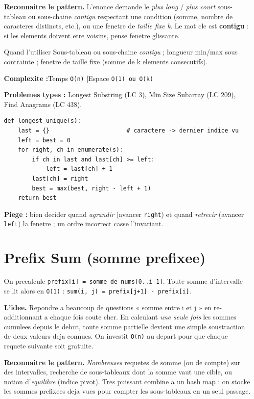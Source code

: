 \documentclass[11pt,a4paper]{article}
\newcommand{\complexite}[2]{%
  \noindent\textbf{Complexite :}\quad Temps \texttt{#1} \quad|\quad Espace \texttt{#2}\par\smallskip}
\newcommand{\leetcode}[1]{\noindent\textbf{Problemes types :} #1\par\medskip}
\begin{document}
\textbf{Reconnaitre le pattern.} L'enonce demande le \emph{plus long} / \emph{plus
court} sous-tableau ou sous-chaine \emph{contigu} respectant une condition (somme,
nombre de caracteres distincts, etc.), ou une fenetre de \emph{taille fixe k}. Le
mot cle est \textbf{contigu} : si les elements doivent etre voisins, pense fenetre
glissante.

\begin{infobox}{Quand l'utiliser}
Sous-tableau ou sous-chaine \emph{contigu} ; longueur min/max sous contrainte ;
fenetre de taille fixe (somme de k elements consecutifs).
\end{infobox}

\complexite{O(n)}{O(1) ou O(k)}
\leetcode{Longest Substring (LC 3), Min Size Subarray (LC 209), Find Anagrams (LC 438).}

\begin{lstlisting}
def longest_unique(s):
    last = {}                      # caractere -> dernier indice vu
    left = best = 0
    for right, ch in enumerate(s):
        if ch in last and last[ch] >= left:
            left = last[ch] + 1
        last[ch] = right
        best = max(best, right - left + 1)
    return best
\end{lstlisting}

\textbf{Piege :} bien decider quand \emph{agrandir} (avancer \texttt{right}) et
quand \emph{retrecir} (avancer \texttt{left}) la fenetre ; un ordre incorrect
casse l'invariant.

\section{Prefix Sum (somme prefixee)}
On precalcule \texttt{prefix[i] = somme de nums[0..i-1]}. Toute somme
d'intervalle se lit alors en \texttt{O(1)} : \texttt{sum(i, j) = prefix[j+1] - prefix[i]}.

\textbf{L'idee.} Repondre a beaucoup de questions « somme entre i et j » en
re-additionnant a chaque fois coute cher. En calculant \emph{une seule fois} les
sommes cumulees depuis le debut, toute somme partielle devient une simple
soustraction de deux valeurs deja connues. On investit \texttt{O(n)} au depart
pour que chaque requete suivante soit gratuite.

\textbf{Reconnaitre le pattern.} \emph{Nombreuses} requetes de somme (ou de
compte) sur des intervalles, recherche de sous-tableaux dont la somme vaut une
cible, ou notion d'\emph{equilibre} (indice pivot). Tres puissant combine a un
hash map : on stocke les sommes prefixees deja vues pour compter les
sous-tableaux en un seul passage.
\end{document}
